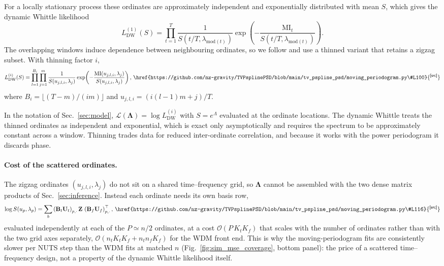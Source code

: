 \documentclass[
  aps,
  prd,
  twocolumn,
  amsmath,
  amssymb,
  nofootinbib,
  superscriptaddress,
  longbibliography,
]{revtex4-2}
\newcommand{\repobase}{https://github.com/nz-gravity/TVPsplinePSD/blob/main}
\DeclareRobustCommand{\codelink}[1]{\,\href{\repobase/#1}{\textsuperscript{\scriptsize\sffamily[src]}}}
\begin{document}
For a locally stationary process these ordinates are approximately independent
and exponentially distributed with mean $S$, which gives the dynamic Whittle
likelihood
\begin{equation}
L^{(1)}_{\mathrm{DW}}(S)
= \prod_{t=1}^{T}
\frac{1}{S(t/T,\lambda_{\mathrm{mod}(t)})}
\exp\!\left(-\frac{\mathrm{MI}_t}{S(t/T,\lambda_{\mathrm{mod}(t)})}\right).
\label{eq:dynamic_whittle}
\end{equation}
The overlapping windows induce dependence between neighbouring ordinates, so we
follow \citet{tang2023MovingPSD} and use a thinned variant that retains a zigzag
subset. With thinning factor $i$,
\begin{equation}
L^{(i)}_{\mathrm{DW}}(S)
= \prod_{l=1}^{B_i}\prod_{j=1}^{m}
\frac{1}{S(u_{j,l,i},\lambda_j)}
\exp\!\left(-\frac{\mathrm{MI}(u_{j,l,i},\lambda_j)}{S(u_{j,l,i},\lambda_j)}\right),
\codelink{tv_pspline_psd/moving_periodogram.py\#L100}
\label{eq:thinned_dynamic_whittle}
\end{equation}
where $B_i = \lfloor (T-m)/(im)\rfloor$ and $u_{j,l,i} = (i(l-1)m+j)/T$.

In the notation of Sec.~\ref{sec:model}, $\mathcal{L}(\bm{\Lambda}) =
\log L^{(i)}_{\mathrm{DW}}$ with $S = e^{\Lambda}$ evaluated at the ordinate
locations. The dynamic Whittle treats the thinned ordinates as independent and
exponential, which is exact only asymptotically and requires the spectrum to be
approximately constant across a window. Thinning trades data for reduced
inter-ordinate correlation, and because it works with the power periodogram it
discards phase.

\paragraph*{Cost of the scattered ordinates.} The zigzag ordinates
$(u_{j,l,i},\lambda_j)$ do not sit on a shared time--frequency grid, so
$\bm{\Lambda}$ cannot be assembled with the two dense matrix products of
Sec.~\ref{sec:inference}. Instead each ordinate needs its own basis row,
\begin{equation}
\log S(u_p,\lambda_p) = \sum_b \left(\mathbf{B}_t\mathbf{U}_t\right)_{p,\cdot}\mathbf{Z}\,
\left(\mathbf{B}_f\mathbf{U}_f\right)_{p,\cdot}^\top,
\codelink{tv_pspline_psd/moving_periodogram.py\#L116}
\end{equation}
evaluated independently at each of the $P\simeq n/2$ ordinates, at a cost
$\mathcal{O}(P\,K_t K_f)$ that scales with the number of ordinates rather than
with the two grid axes separately, $\mathcal{O}(n_t K_t K_f + n_t n_f K_f)$ for
the WDM front end. This is why the moving-periodogram fits are consistently
slower per NUTS step than the WDM fits at matched $n$
(Fig.~\ref{fig:sim_mse_coverage}, bottom panel): the price of a scattered
time--frequency design, not a property of the dynamic Whittle likelihood
itself.
\end{document}
